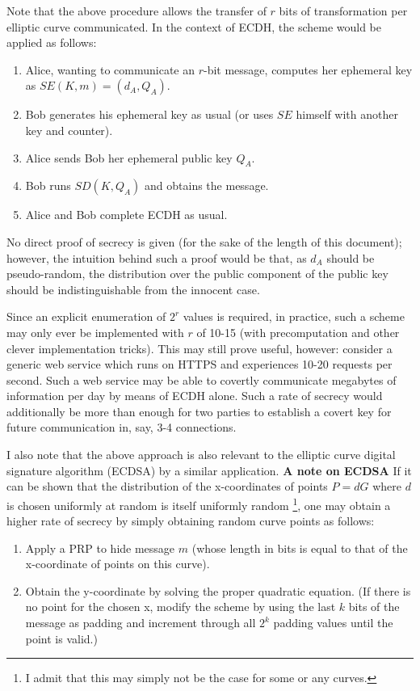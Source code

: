 \documentclass{article}
\begin{document}
Note that the above procedure allows the transfer of $r$ bits of transformation per elliptic curve communicated.  In the context 
of ECDH, the scheme would be applied as follows:

\begin{enumerate}
\item{Alice, wanting to communicate an $r$-bit message, computes her ephemeral key as $SE(K,m) = (d_A, Q_A)$.}
\item{Bob generates his ephemeral key as usual (or uses $SE$ himself with another key and counter).}
\item{Alice sends Bob her ephemeral public key  $Q_A$.}
\item{Bob runs $SD(K,Q_A)$ and obtains the message.}
\item{Alice and Bob complete ECDH as usual.}
\end{enumerate}

No direct proof of secrecy is given (for the sake of the length of this document); however, the intuition behind such a proof would be that, 
as $d_A$ should be pseudo-random, the distribution over the public component of the public key should be indistinguishable from the innocent case.

Since an explicit enumeration of $2^r$ values is required, in practice, such a scheme may only ever be implemented with 
$r$ of 10-15 (with precomputation and other clever implementation tricks).  This may still prove useful, however: consider a 
generic web service which runs on HTTPS and experiences 10-20 requests per second.  Such a web service may be able to covertly
communicate megabytes of information per day by means of ECDH alone.  Such a rate of secrecy would additionally be more than enough for 
two parties to establish a covert key for future communication in, say, 3-4 connections.

I also note that the above approach is also relevant to the elliptic curve digital signature algorithm (ECDSA) by a similar application.
\newline\newline
\textbf{A note on ECDSA } If it can be shown that the distribution of the x-coordinates of points $P = dG$ where $d$ is chosen uniformly 
at random is itself uniformly random \footnote{I admit that this may simply not be the case for some or any curves.}, one may obtain a higher 
rate of secrecy by simply obtaining random curve points as follows:

\begin{enumerate}
\item{Apply a PRP to hide message $m$ (whose length in bits is equal to that of the x-coordinate of points on this curve).}
\item{Obtain the y-coordinate by solving the proper quadratic equation.  (If there is no point for the chosen x, 
modify the scheme by using the last $k$ bits of the message as padding and increment through all $2^k$ padding values until 
the point is valid.)}
\end{enumerate}
\end{document}
